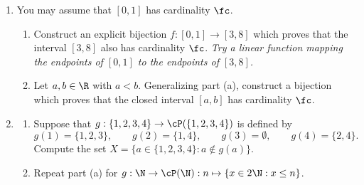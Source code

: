 % 
%   

\begin{exercises}{}{}

\begin{enumerate}
  \item You may assume that $[0,1]$ has cardinality $\fc$.
  \begin{enumerate}
    \item Construct an explicit bijection $f:[0,1]\to [3,8]$ which proves that the interval $[3,8]$ also has cardinality $\fc$. \emph{Try a linear function mapping the endpoints of $[0,1]$ to the endpoints of $[3,8]$.}
    \item Let $a,b\in\R$ with $a<b$. Generalizing part (a), construct a bijection which proves that the closed interval $[a,b]$ has cardinality $\fc$.
  \end{enumerate}
  
  \item\begin{enumerate}
    \item Suppose that $g:\{1,2,3,4\}\to\cP(\{1,2,3,4\})$ is defined by
  	\[g(1)=\{1,2,3\},\qquad g(2)=\{1,4\},\qquad g(3)=\emptyset,\qquad g(4)=\{2,4\}.\]
  	Compute the set $X=\bigl\{a\in\{1,2,3,4\}:a\not\in g(a)\bigr\}$.
  	\item Repeat part (a) for $g:\N\to\cP(\N):n\mapsto\{x\in 2\N:x\le n\}$.
  \end{enumerate}
  

\end{enumerate}
\end{exercises}
